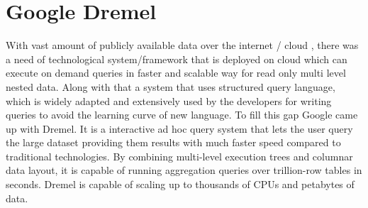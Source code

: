 \section{Google Dremel}

With vast amount of publicly available data over the internet / cloud , there was a need of technological system/framework that is deployed on cloud which can execute on demand queries in faster and scalable way for read only multi level nested data. Along with that a system that uses structured query language, which is widely adapted and extensively used by the developers for writing queries to avoid the learning curve of new language. To fill this gap Google came up with Dremel. It is a interactive ad hoc query system that lets the user query the large dataset providing them results with much faster speed compared to traditional technologies\cite{www-dremel}. By combining multi-level execution trees and columnar data layout, it is capable of running aggregation queries over trillion-row tables in seconds\cite{www-dremel}. Dremel is capable of scaling up to thousands of CPUs and petabytes of data\cite{www-dremel}.
